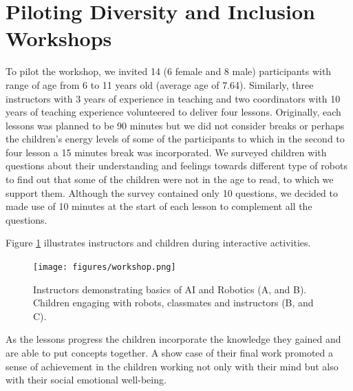 \documentclass[conference]{IEEEtran}
\begin{document}
\section{Piloting Diversity and Inclusion Workshops}
To pilot the workshop, we invited 14 (6 female and 8 male) participants with range of age from 6 to 11 years old (average age of 7.64).
Similarly, three instructors with 3 years of experience in teaching and two coordinators with 10 years of teaching experience volunteered to deliver four lessons.
Originally, each lessons was planned to be 90 minutes but we did not consider breaks or perhaps the children's energy levels of some of the participants to which in the second to four lesson a 15 minutes break was incorporated.
We surveyed children with questions about their understanding and feelings towards different type of robots to find out that some of the children were not in the age to read, to which we support them. 
Although the survey contained only 10 questions, we decided to made use of 10 minutes at the start of each lesson to complement all the questions.

Figure \ref{fig:pilot} illustrates instructors and children during interactive activities. 
\begin{figure}[htbp]
    \centerline{\texttt{[image: figures/workshop.png]}}
    \caption{
        Instructors demonstrating basics of AI and Robotics (A, and B). 
        Children engaging with robots, classmates and instructors (B, and C).
        }
    \label{fig:pilot}
\end{figure}


As the lessons progress the children incorporate the knowledge they gained and are able to put concepts together. 
A show case of their final work promoted a sense of achievement in the children working not only with their mind but also with their social emotional well-being. 


    
\end{document}
